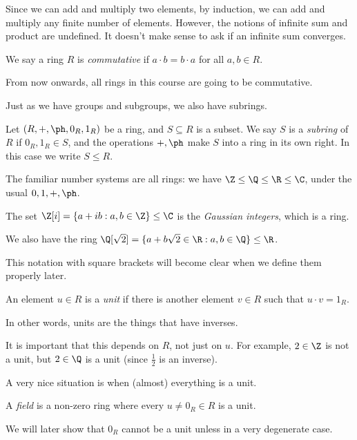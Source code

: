 \documentclass[a4paper]{article}
\begin{document}
Since we can add and multiply two elements, by induction, we can add and multiply any finite number of elements. However, the notions of infinite sum and product are undefined. It doesn't make sense to ask if an infinite sum converges.

\begin{defi}
  We say a ring $R$ is \emph{commutative} if $a \cdot b = b \cdot a$ for all $a, b \in R$.
\end{defi}

From now onwards, all rings in this course are going to be commutative.

Just as we have groups and subgroups, we also have subrings.
\begin{defi}[Subring]
  Let $(R, +, \ph, 0_R, 1_R)$ be a ring, and $S \subseteq R$ is a subset. We say $S$ is a \emph{subring} of $R$ if $0_R, 1_R \in S$, and the operations $+, \ph$ make $S$ into a ring in its own right. In this case we write $S \leq R$.
\end{defi}

\begin{eg}
  The familiar number systems are all rings: we have $\Z \leq \Q \leq \R \leq \C$, under the usual $0, 1, +, \ph$.
\end{eg}

\begin{eg}
  The set $\Z[i] = \{a + ib: a, b \in \Z\} \leq \C$ is the \emph{Gaussian integers}, which is a ring.

  We also have the ring $\Q[\sqrt{2}] = \{a + b \sqrt{2} \in \R: a, b \in \Q\} \leq \R$.
\end{eg}
This notation with square brackets will become clear when we define them properly later.

\begin{defi}[Unit]
  An element $u \in R$ is a \emph{unit} if there is another element $v \in R$ such that $u \cdot v = 1_R$.
\end{defi}
In other words, units are the things that have inverses.

It is important that this depends on $R$, not just on $u$. For example, $2 \in \Z$ is not a unit, but $2 \in \Q$ is a unit (since $\frac{1}{2}$ is an inverse).

A very nice situation is when (almost) everything is a unit.
\begin{defi}[Field]
  A \emph{field} is a non-zero ring where every $u \not= 0_R \in R$ is a unit.
\end{defi}
We will later show that $0_R$ cannot be a unit unless in a very degenerate case.
\end{document}
